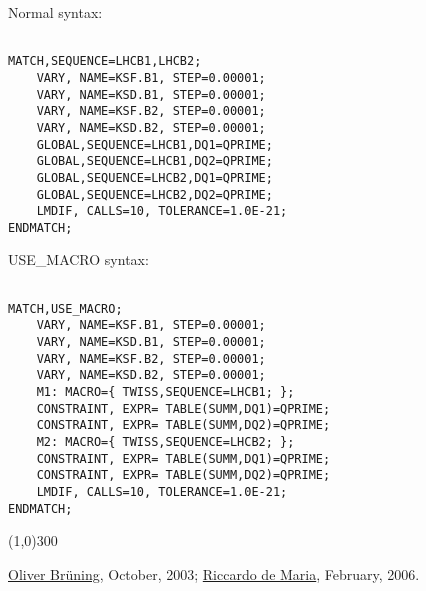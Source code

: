 Normal syntax:

\begin{verbatim}

MATCH,SEQUENCE=LHCB1,LHCB2;
    VARY, NAME=KSF.B1, STEP=0.00001;
    VARY, NAME=KSD.B1, STEP=0.00001;
    VARY, NAME=KSF.B2, STEP=0.00001;
    VARY, NAME=KSD.B2, STEP=0.00001;
    GLOBAL,SEQUENCE=LHCB1,DQ1=QPRIME;
    GLOBAL,SEQUENCE=LHCB1,DQ2=QPRIME;
    GLOBAL,SEQUENCE=LHCB2,DQ1=QPRIME;
    GLOBAL,SEQUENCE=LHCB2,DQ2=QPRIME;
    LMDIF, CALLS=10, TOLERANCE=1.0E-21;
ENDMATCH;
\end{verbatim}

USE\_MACRO syntax:

\begin{verbatim}

MATCH,USE_MACRO;
    VARY, NAME=KSF.B1, STEP=0.00001;
    VARY, NAME=KSD.B1, STEP=0.00001;
    VARY, NAME=KSF.B2, STEP=0.00001;
    VARY, NAME=KSD.B2, STEP=0.00001;
    M1: MACRO={ TWISS,SEQUENCE=LHCB1; };
    CONSTRAINT, EXPR= TABLE(SUMM,DQ1)=QPRIME;
    CONSTRAINT, EXPR= TABLE(SUMM,DQ2)=QPRIME;
    M2: MACRO={ TWISS,SEQUENCE=LHCB2; };
    CONSTRAINT, EXPR= TABLE(SUMM,DQ1)=QPRIME;
    CONSTRAINT, EXPR= TABLE(SUMM,DQ2)=QPRIME;
    LMDIF, CALLS=10, TOLERANCE=1.0E-21;
ENDMATCH;
\end{verbatim}

\line(1,0){300}

\href{http://bruening.home.cern.ch/bruening/}{Oliver Br\"uning},
October, 2003;
\href{http://rdemaria.home.cern.ch/rdemaria/}{Riccardo de Maria}, February, 2006.

